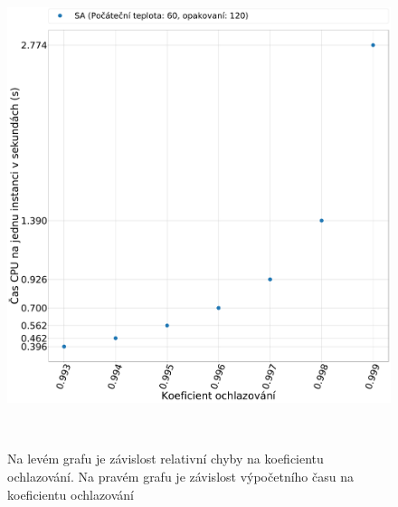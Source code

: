 \documentclass[11pt]{article}
\begin{document}
\begin{figure}
\begin{minipage}[c]{0.42\textwidth}
        \centering \includegraphics[width=\textwidth]{img/KT.pdf} 
    \end{minipage}
    \\
   \caption{Na levém grafu je závislost relativní chyby na koeficientu ochlazování. Na pravém grafu je závislost výpočetního času na koeficientu ochlazování}\label{fig:GZNK}
\end{figure} 
\end{document}
